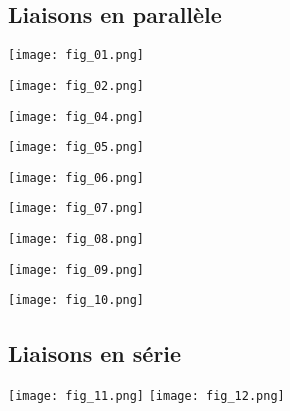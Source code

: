 \ifprof
\begin{multicols}{2}
\else
\begin{multicols}{2}
\fi


\subsection*{Liaisons en parallèle}


\begin{center}
\texttt{[image: fig\_01.png]}
\end{center}

\begin{center}
\texttt{[image: fig\_02.png]}
\end{center}

\begin{center}
\end{center}

\begin{center}
\texttt{[image: fig\_04.png]}
\end{center}

\begin{center}
\texttt{[image: fig\_05.png]}
\end{center}

\begin{center}
\texttt{[image: fig\_06.png]}
\end{center}

\begin{center}
\texttt{[image: fig\_07.png]}
\end{center}

\begin{center}
\texttt{[image: fig\_08.png]}
\end{center}

\begin{center}
\texttt{[image: fig\_09.png]}
\end{center}

\begin{center}
\texttt{[image: fig\_10.png]}
\end{center}


\subsection*{Liaisons en série}



\begin{center}
\texttt{[image: fig\_11.png]}
\hspace{1cm}
\texttt{[image: fig\_12.png]}
\end{center}

\ifprof
\end{multicols}
\else
\end{multicols}
\fi


